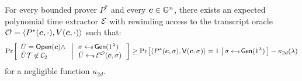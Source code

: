 \begin{lemma}[Soundness]\label{lem:proximity2d_sound}
For every bounded prover $P^\ast$ and every $\bm{c}\in \mathbb{G}^n$, there exists an
expected polynomial time extractor $\mathcal{E}$ with
rewinding access to the transcript oracle $\mathcal{O}=\langle P^\ast(\bm{c},\cdot),V(\bm{c},\cdot)\rangle$
such that:
\begin{align*}
\condprob{
\begin{array}{l}
\bar{U} = \open(\bm{c}) \wedge \\
\bar{U}\mc{T}\not\in \mc{C}_2
\end{array}
}{
\begin{array}{l}
\sigma\sample \gen(\secparam) \\
\bar{U}\sample \extr^{\mc{O}}(\bm{c},\sigma)
\end{array}}
\geq 
\condprob{\langle P^\ast(\bm{c},\sigma),\verifier(\bm{c},\sigma)\rangle =
1}{\sigma\sample \gen(\secparam)} - \kappa_{2d}(\secpar)
\end{align*}
for a negligible function $\kappa_{2d}$.
\end{lemma}
